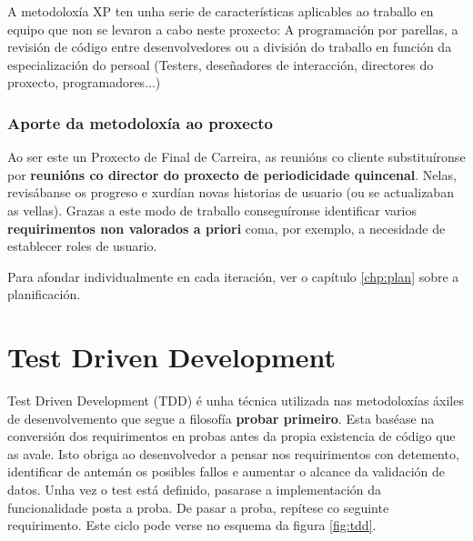 A metodoloxía XP ten unha serie de características aplicables ao traballo en equipo que non se levaron a cabo neste proxecto: A programación por parellas, a revisión de código entre desenvolvedores ou a división do traballo en función da especialización do persoal (Testers, deseñadores de interacción, directores do proxecto, programadores...)

\subsubsection{Aporte da metodoloxía ao proxecto}

Ao ser este un Proxecto de Final de Carreira, as reunións co cliente substituíronse por \textbf{reunións co director do proxecto de periodicidade quincenal}. Nelas, revisábanse os progreso e xurdían novas historias de usuario (ou se actualizaban as vellas). Grazas a este modo de traballo conseguíronse identificar varios \textbf{requirimentos non valorados a priori} coma, por exemplo, a necesidade de establecer roles de usuario. 

Para afondar individualmente en cada iteración, ver o capítulo \ref{chp:plan} sobre a planificación.


\section{Test Driven Development}

Test Driven Development (TDD) é unha técnica utilizada nas metodoloxías áxiles de desenvolvemento que segue a filosofía \textbf{probar primeiro}. Esta baséase na conversión dos requirimentos en probas antes da propia existencia de código que as avale. Isto obriga ao desenvolvedor a pensar nos requirimentos con detemento, identificar de antemán os posibles fallos e aumentar o alcance da validación de datos. Unha vez o test está definido, pasarase a implementación da funcionalidade posta a proba. De pasar a proba, repítese co seguinte requirimento. Este ciclo pode verse no esquema da figura \ref{fig:tdd}.

